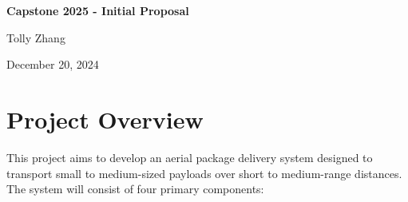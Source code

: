 \documentclass[12pt]{article}
\begin{document}
\begin{titlepage}
    \centering
    \vfill
    \vspace*{2.5in}
    {\Huge\bfseries Capstone 2025 - Initial Proposal \par}
    \vspace{0.2in}
    {\LARGE Tolly Zhang \par}    
    \vspace{0.2in}
    {\LARGE December 20, 2024 \par}
    \vfill
\end{titlepage}

\newpage
\section*{Project Overview}
This project aims to develop an aerial package delivery system designed to transport small to medium-sized payloads over short to medium-range distances. The system will consist of four primary components:
\end{document}
